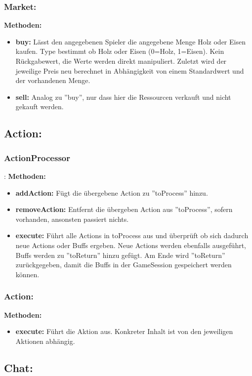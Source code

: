 \documentclass[fontsize=12pt,paper=a4,twoside]{scrartcl}
\begin{document}
\subsubsection{Market:}
\textbf{Methoden:}
\begin{itemize}
	\item \textbf{buy:} Lässt den angegebenen Spieler die angegebene Menge Holz oder Eisen kaufen. Type bestimmt ob Holz oder Eisen (0=Holz, 1=Eisen). Kein Rückgabewert, die Werte werden direkt manipuliert. Zuletzt wird der jeweilige Preis neu berechnet in Abhängigkeit von einem Standardwert und der vorhandenen Menge.
	\item \textbf{sell:} Analog zu ''buy'', nur dass hier die Ressourcen verkauft und nicht gekauft werden.
\end{itemize}

\subsection{Action:}
\subsubsection{ActionProcessor}:
\textbf{Methoden:}
\begin{itemize}
	\item \textbf{addAction:} Fügt die übergebene Action zu ''toProcess'' hinzu.
	\item \textbf{removeAction:} Entfernt die übergeben Action aus ''toProcess'', sofern vorhanden, ansonsten passiert nichts.
	\item \textbf{execute:} Führt alle Actions in toProcess aus und überprüft ob sich dadurch neue Actions oder Buffs ergeben. Neue Actions werden ebenfalls ausgeführt, Buffs werden zu ''toReturn'' hinzu gefügt. Am Ende wird ''toReturn'' zurückgegeben, damit die Buffs in der GameSession gespeichert werden können.
\end{itemize}

\subsubsection{Action:}
\textbf{Methoden:}
\begin{itemize}
	\item \textbf{execute:} Führt die Aktion aus. Konkreter Inhalt ist von den jeweiligen Aktionen abhängig.
\end{itemize}



\subsection{Chat:}
\end{document}
